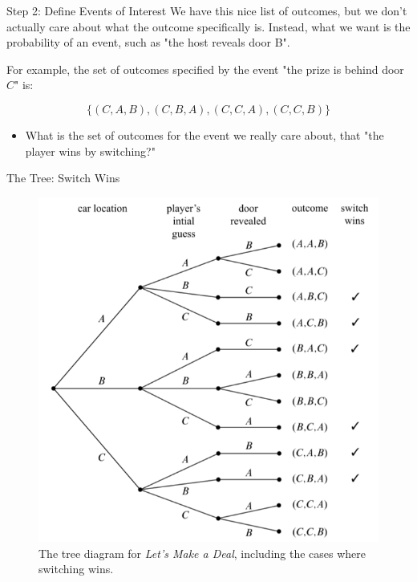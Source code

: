 \documentclass{beamer}
\begin{document}
\begin{frame}{Step 2: Define Events of Interest}
    We have this nice list of outcomes, but we don't actually care about what the outcome specifically is. Instead, what we want is the probability of an event, such as "the host reveals door B". 
    
    For example, the set of outcomes specified by the event "the prize is behind door $C$" is:
    
    \[ \{(C, A, B),(C, B, A),(C, C, A),(C, C, B)\}\]
    
    \begin{itemize}
        \item What is the set of outcomes for the event we really care about, that "the player wins by switching?"
    \end{itemize}
    \vspace{2mm}
\end{frame}

\begin{frame}{The Tree: Switch Wins}
    \begin{figure}
        \centering
        \includegraphics[scale=.5]{montyhalloutcomes2.png}
        \caption{The tree diagram for \textit{Let's Make a Deal}, including the cases where switching wins.}
        \label{fig:montyhalloutcomes2}
    \end{figure}
\end{frame}
\end{document}
